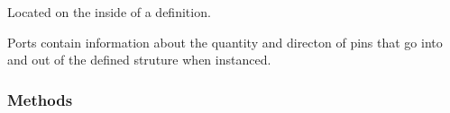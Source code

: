 \documentclass[letterpaper,10pt,english,openany,oneside]{sphinxmanual}
\begin{document}
\begin{fulllineitems}
\label{\detokenize{reference/classes/port:spydrnet.Port}}
Located on the inside of a definition.

Ports contain information about the quantity and directon of pins that go into and out of the defined struture when instanced.

\end{fulllineitems}



\subsubsection{Methods}
\label{\detokenize{reference/classes/port:methods}}
\end{document}
